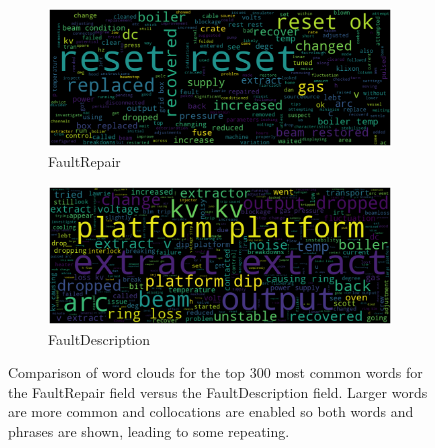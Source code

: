 \documentclass[10pt,oneside]{report}
\begin{document}
\begin{figure}[htbp]
    \centering
    \begin{subfigure}[b]{0.48\textwidth}
        \centering
        \includegraphics[width=\textwidth]{wcFaultRepairs.png}
        \caption{FaultRepair}
        \label{fig:wcFaultRepairs}
    \end{subfigure}%
    \hfill
    \begin{subfigure}[b]{0.48\textwidth}
        \centering
        \includegraphics[width=\textwidth]{wcFaultDescription.png}
        \caption{FaultDescription}
        \label{fig:wcFaultDescription}
    \end{subfigure}
    \caption{Comparison of word clouds for the top 300 most common words for the FaultRepair field versus the FaultDescription field. Larger words are more common and collocations are enabled so both words and phrases are shown, leading to some repeating.}
    \label{fig:wc}
\end{figure}

\end{document}
